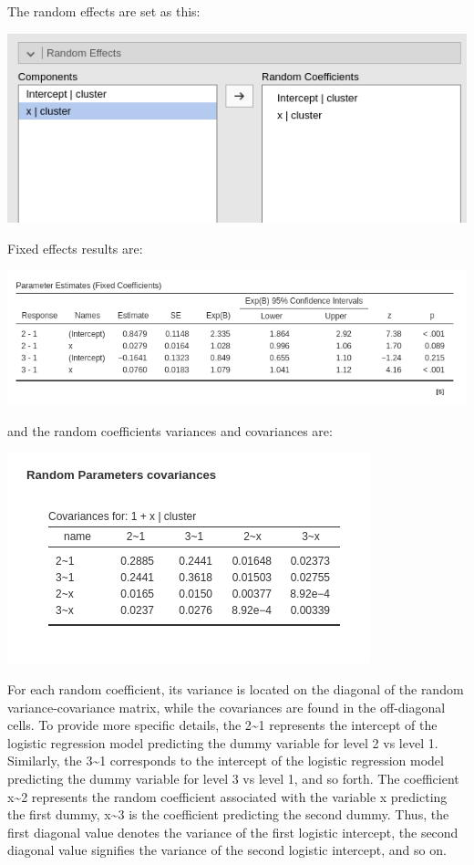 \documentclass[
]{book}
\begin{document}
The random effects are set as this:

\includegraphics[width=0.7\linewidth]{bookletpics/5_multinomial_input2}

Fixed effects results are:

\includegraphics[width=0.9\linewidth]{bookletpics/5_multinomial_output1}

and the random coefficients variances and covariances are:

\includegraphics[width=0.5\linewidth]{bookletpics/5_multinomial_output2}

For each random coefficient, its variance is located on the diagonal of the random variance-covariance matrix, while the covariances are found in the off-diagonal cells. To provide more specific details, the 2\textasciitilde1 represents the intercept of the logistic regression model predicting the dummy variable for level 2 vs level 1. Similarly, the 3\textasciitilde1 corresponds to the intercept of the logistic regression model predicting the dummy variable for level 3 vs level 1, and so forth. The coefficient x\textasciitilde2 represents the random coefficient associated with the variable x predicting the first dummy, x\textasciitilde3 is the coefficient predicting the second dummy. Thus, the first diagonal value denotes the variance of the first logistic intercept, the second diagonal value signifies the variance of the second logistic intercept, and so on.
\end{document}

